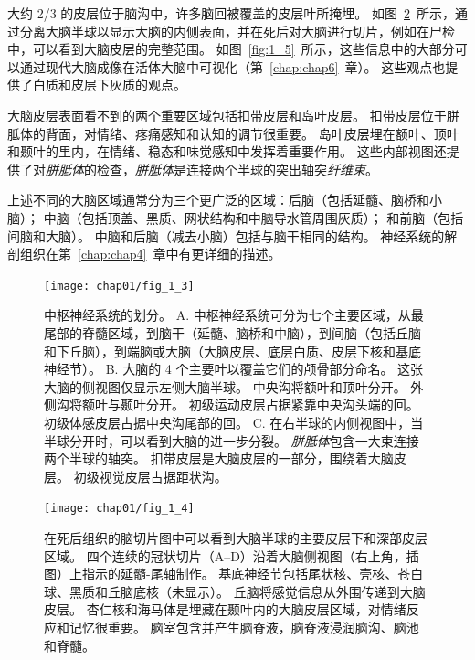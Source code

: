 \begin{proposition}[中枢神经系统的解剖学组织]
	\quad \quad 大约 2/3 的皮层位于脑沟中，许多脑回被覆盖的皮层叶所掩埋。
	如图~\ref{fig:1_4}~所示，通过分离大脑半球以显示大脑的内侧表面，并在死后对大脑进行切片，例如在尸检中，可以看到大脑皮层的完整范围。
	如图~\ref{fig:1_5}~所示，这些信息中的大部分可以通过现代大脑成像在活体大脑中可视化（第~\ref{chap:chap6}~章）。
	这些观点也提供了白质和皮层下灰质的观点。
	
	\quad \quad 大脑皮层表面看不到的两个重要区域包括扣带皮层和岛叶皮层。
	扣带皮层位于胼胝体的背面，对情绪、疼痛感知和认知的调节很重要。
	岛叶皮层埋在额叶、顶叶和颞叶的里内，在情绪、稳态和味觉感知中发挥着重要作用。
	这些内部视图还提供了对\textit{胼胝体}的检查，\textit{胼胝体}是连接两个半球的突出轴突\textit{纤维束}。
	
	\quad \quad 上述不同的大脑区域通常分为三个更广泛的区域：后脑（包括延髓、脑桥和小脑）；
	中脑（包括顶盖、黑质、网状结构和中脑导水管周围灰质）；
	和前脑（包括间脑和大脑）。
	中脑和后脑（减去小脑）包括与脑干相同的结构。
	神经系统的解剖组织在第~\ref{chap:chap4}~章中有更详细的描述。
		
\end{proposition}


\begin{figure}[htbp]
	\centering
	\texttt{[image: chap01/fig\_1\_3]}
	\caption{中枢神经系统的划分。
		A. 中枢神经系统可分为七个主要区域，从最尾部的脊髓区域，到脑干（延髓、脑桥和中脑），到间脑（包括丘脑和下丘脑），到端脑或大脑（大脑皮层、底层白质、皮层下核和基底神经节）。
		B. 大脑的 4 个主要叶以覆盖它们的颅骨部分命名。
		这张大脑的侧视图仅显示左侧大脑半球。
		中央沟将额叶和顶叶分开。
		外侧沟将额叶与颞叶分开。
		初级运动皮层占据紧靠中央沟头端的回。
		初级体感皮层占据中央沟尾部的回。
		C. 在右半球的内侧视图中，当半球分开时，可以看到大脑的进一步分裂。
		\textit{胼胝体}包含一大束连接两个半球的轴突。
		扣带皮层是大脑皮层的一部分，围绕着大脑皮层。
		初级视觉皮层占据距状沟。}
	\label{fig:1_3}
\end{figure}


\begin{figure}[htbp]
	\centering
	\texttt{[image: chap01/fig\_1\_4]}
	\caption{在死后组织的脑切片图中可以看到大脑半球的主要皮层下和深部皮层区域。
		四个连续的冠状切片（A–D）沿着大脑侧视图（右上角，插图）上指示的延髓-尾轴制作。
		基底神经节包括尾状核、壳核、苍白球、黑质和丘脑底核（未显示）。
		丘脑将感觉信息从外围传递到大脑皮层。
		杏仁核和海马体是埋藏在颞叶内的大脑皮层区域，对情绪反应和记忆很重要。
		脑室包含并产生脑脊液，脑脊液浸润脑沟、脑池和脊髓\cite{nieuwenhuys2007human}。}
	\label{fig:1_4}
\end{figure}


